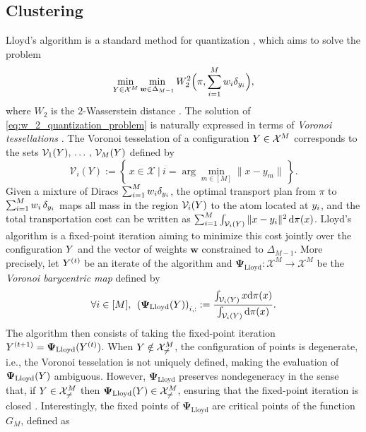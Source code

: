 \subsection{Clustering}
Lloyd's algorithm is a standard method for quantization \cite{Llo82}, which aims to solve the problem
\begin{equation}\label{eq:w_2_quantization_problem}
    \min\limits_{Y \in \mathcal{X}^{M}} \min\limits_{\bm{w} \in \Delta_{M-1}} W_{2}^{2}\Big(\pi, \sum\limits_{i = 1}^{M} w_{i} \delta_{y_{i}} \Big),
\end{equation}
where $W_{2}$ is the $2$-Wasserstein distance \cite{PeCu19}.
The solution of \eqref{eq:w_2_quantization_problem} is naturally expressed in terms of \emph{Voronoi tessellations} \cite{DuFaGu99}. The Voronoi tesselation of a configuration $Y \in \mathcal{X}^{M}$ corresponds to the sets $\mathcal{V}_{1}(Y),\, \dots \,, \,\mathcal{V}_{M}(Y)$ defined by 
\begin{equation}
\mathcal{V}_{i}(Y) := \left\{\,x\in\mathcal{X}\ \Big|\ i = \arg\min_{m\in[M]} \|x - y_m\|\,\right\}.
\end{equation}
Given a mixture of Diracs $\sum_{i = 1}^{M} w_{i} \delta_{y_{i}}$, the optimal transport plan from $\pi$ to $\sum_{i=1}^M w_{i} \,\delta_{y_{i}}$ maps all mass in the region $\mathcal{V}_i(Y)$ to the atom located at $y_{i}$, and the total transportation cost can be written as $\sum_{i=1}^M \int_{\mathcal{V}_i(Y)}\|x- y_{i}\|^2 \,\mathrm{d}\pi(x)$. Lloyd's algorithm is a fixed-point iteration aiming to minimize this cost jointly over the configuration $Y$ and the vector of weights $\bm{w}$ constrained to $\Delta_{M-1}$. More precisely, let $Y^{(t)}$ be an iterate of the algorithm and $\bm{\Psi}_{\mathrm{Lloyd}}: \mathcal{X}^{M} \rightarrow \mathcal{X}^{M}$ be the \emph{Voronoi barycentric map} defined by 
\begin{equation}\label{eq:lloyd_map}
\forall i \in [M], \:\:  \left(\bm{\Psi}_{\mathrm{Lloyd}}(Y)\right)_{i, :} := \frac{\int_{\mathcal{V}_{i}(Y)}x \mathrm{d} \pi(x)}{\int_{\mathcal{V}_{i}(Y)}\mathrm{d} \pi(x)} .
\end{equation}
The algorithm then consists of taking the fixed-point iteration $Y^{(t+1)} = \bm{\Psi}_{\mathrm{Lloyd}}(Y^{(t)})$. When $Y \notin \mathcal{X}_{\neq}^{M}$, the configuration of points is degenerate, i.e., the Voronoi tesselation is not uniquely defined, making the evaluation of $\bm{\Psi}_{\mathrm{Lloyd}}(Y)$ ambiguous. However, $\bm{\Psi}_{\mathrm{Lloyd}}$ preserves nondegeneracy in the sense that, if $Y \in \mathcal{X}_{\neq}^{M}$ then $\bm{\Psi}_{\mathrm{Lloyd}}(Y) \in \mathcal{X}_{\neq}^{M}$, ensuring that the fixed-point iteration is closed \cite{EmJuRa08}. Interestingly, the fixed points of $\bm{\Psi}_{\mathrm{Lloyd}}$ are critical points of the function $G_M$, defined as \citep[Proposition 6.2.]{DuFaGu99}
